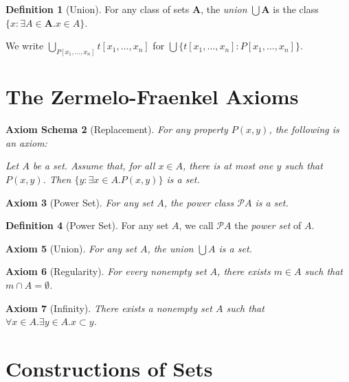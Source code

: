 \documentclass{report}
\newtheorem{axiom}{Axiom}[section]
\newtheorem{axioms}[axiom]{Axiom Schema}
\theoremstyle{definition}
\newtheorem{definition}[axiom]{Definition}
\begin{document}
    \begin{definition}[Union]
        For any class of sets $\mathbf{A}$, the \emph{union} $\bigcup \mathbf{A}$ is the class
        $\{ x : \exists A \in \mathbf{A}. x \in A \}$.

        We write $\bigcup_{P[x_1, \ldots, x_n]} t[x_1, \ldots, x_n]$ for $\bigcup \{ t[x_1, \ldots, x_n]
        : P[x_1, \ldots, x_n] \}$.
    \end{definition}

    \section{The Zermelo-Fraenkel Axioms}

    \begin{axioms}[Replacement]
        For any property $P(x,y)$, the following is an axiom:

        Let $A$ be a set. Assume that, for all $x \in A$, there is at most one $y$ such that $P(x,y)$.
        Then $\{ y : \exists x \in A. P(x,y) \}$ is a set.
    \end{axioms}

    \begin{axiom}[Power Set]
        For any set $A$, the power class $\mathcal{P} A$ is a set.
    \end{axiom}

    \begin{definition}[Power Set]
        For any set $A$, we call $\mathcal{P} A$ the \emph{power set} of $A$.
    \end{definition}

    \begin{axiom}[Union]
        For any set $A$, the union $\bigcup A$ is a set.
    \end{axiom}

    \begin{axiom}[Regularity]
        For every nonempty set $A$, there exists $m \in A$ such that $m \cap A = \emptyset$.
    \end{axiom}

    \begin{axiom}[Infinity]
        There exists a nonempty set $A$ such that $\forall x \in A. \exists y \in A. x \subset y$.
    \end{axiom}

    \section{Constructions of Sets}
\end{document}
